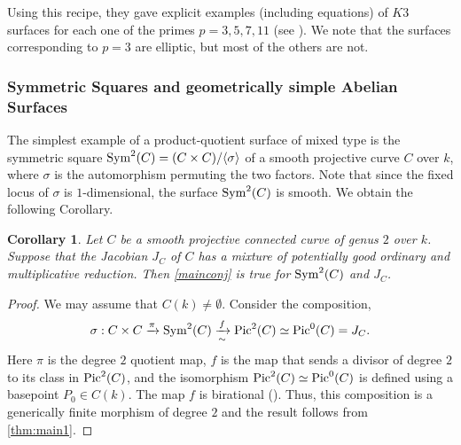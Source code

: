 \documentclass[12pt]{amsart}
\newtheorem{cor}[cor]{Corollary}
\theoremstyle{remark}
\renewcommand{\1}{{\mathbb{S}}}
\newcommand{\Pic}{{\rm Pic}}
\newcommand{\<}{\langle}
\renewcommand{\>}{\rangle}
\newcommand{\Sym}{{\operatorname{\rm Sym}}}
\begin{document}
Using this recipe, they gave explicit examples (including equations) of $K3$ surfaces for each one of the primes $p=3, 5, 7, 11$ (see \cite[Section 7]{GP}). We note that the surfaces corresponding to $p=3$ are elliptic, but most of the others are not. 


\subsubsection{Symmetric Squares and geometrically simple Abelian Surfaces}\label{sec:Jac}
The simplest example of a product-quotient surface of mixed type is the symmetric square $\Sym^2(C)=(C\times C)/\langle\sigma\rangle$ of a smooth projective curve $C$ over $k$, where $\sigma$ is the automorphism permuting the two factors. Note that since the fixed locus of $\sigma$ is $1$-dimensional, the surface $\Sym^2(C)$ is smooth. We obtain the following Corollary. 

\begin{cor}\label{cor:Sym2}
    Let $C$ be a smooth projective connected curve of genus $2$ over $k$. Suppose that the Jacobian $J_C$ of $C$ has a mixture of potentially good ordinary and multiplicative reduction. Then \autoref{mainconj} is true for $\Sym^2(C)$ and $J_C$. 
\end{cor}
\begin{proof} We may assume that $C(k)\neq\emptyset$. 
Consider the composition, 
\[\sigma: C\times C\xrightarrow{\pi}\Sym^2(C)\xrightarrow[\sim]{f} \Pic^2(C)\simeq \Pic^0(C)=J_C.\] Here $\pi$ is the degree $2$ quotient map, $f$ is the map that sends a divisor of degree $2$ to its class in $\Pic^2(C)$, and the isomorphism $\Pic^2(C)\simeq\Pic^0(C)$ is defined using a basepoint $P_0\in C(k)$. The map $f$ is birational (\cite[III.5, Theorem 5.1]{Milne}). Thus, this composition is a generically finite morphism of degree $2$ and the result follows from \autoref{thm:main1}. 
    
\end{proof}
\end{document}
